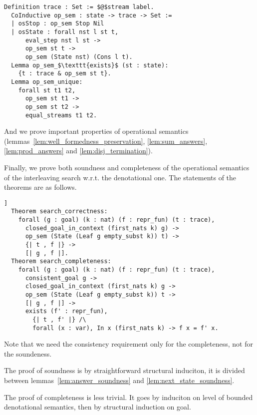 \begin{lstlisting}[language=Coq]
  Definition trace : Set := $@$stream label.
  CoInductive op_sem : state -> trace -> Set :=
  | osStop : op_sem Stop Nil
  | osState : forall nst l st t,
      eval_step nst l st ->
      op_sem st t ->
      op_sem (State nst) (Cons l t).
  Lemma op_sem_$\texttt{exists}$ (st : state):
    {t : trace & op_sem st t}.
  Lemma op_sem_unique:
    forall st t1 t2,
      op_sem st t1 ->
      op_sem st t2 ->
      equal_streams t1 t2.
\end{lstlisting}

And we prove important properties of operational semantics (lemmas~\ref{lem:well_formedness_preservation}, \ref{lem:sum_answers}, \ref{lem:prod_answers} and \ref{lem:disj_termination}).

Finally, we prove both soundness and completeness of the operational semantics of the interleaving search w.r.t. the denotational one.
The statements of the theorems are as follows.

\begin{lstlisting}[language=Coq]]
  Theorem search_correctness:
    forall (g : goal) (k : nat) (f : repr_fun) (t : trace),
      closed_goal_in_context (first_nats k) g) ->
      op_sem (State (Leaf g empty_subst k)) t) ->
      {| t , f |} ->
      [| g , f |].
  Theorem search_completeness:
    forall (g : goal) (k : nat) (f : repr_fun) (t : trace),
      consistent_goal g ->
      closed_goal_in_context (first_nats k) g ->
      op_sem (State (Leaf g empty_subst k)) t ->
      [| g , f |] ->
      exists (f' : repr_fun),
        {| t , f' |} /\
        forall (x : var), In x (first_nats k) -> f x = f' x.
\end{lstlisting}

Note that we need the consistency requirement only for the completeness, not for the soundeness.

The proof of soundness is by straightforward structural induciton, it is divided between lemmas~\ref{lem:answer_soundness} and \ref{lem:next_state_soundness}.

The proof of completeness is less trivial. It goes by induciton on level of bounded denotational semantics, then by structural induction on goal.


